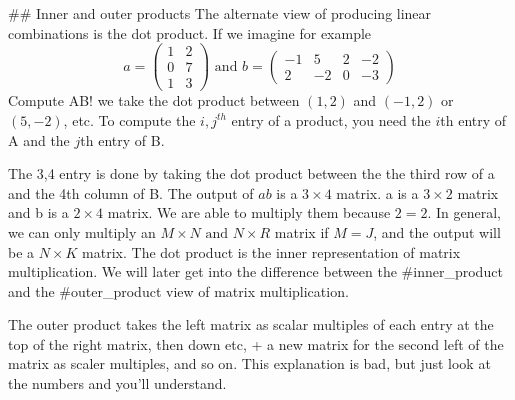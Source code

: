 
## Inner and outer products
The alternate view of producing linear combinations is the dot product. 
If we imagine for example
$$ a = \begin{pmatrix} 1 & 2  \\ 0 & 7  \\ 1 & 3 \end{pmatrix} \text{ and }  b = \begin{pmatrix} -1 & 5 & 2 & -2 \\ 2 & -2 & 0 & -3 \end{pmatrix} $$ 
Compute AB!
we take the dot product between $(1,2)$ and $(-1,2)$ or $(5,-2)$, etc.
To compute the $i,j^{th}$  entry of a product, you need the $i$th entry of A and the $j$th entry of B. 

The 3,4 entry is done by taking the dot product between the the third row of a and the 4th column of B.  The output of $ab$ is a $3\times 4$ matrix. a is a $3\times 2$ matrix and b is a $2 \times 4$ matrix. We are able to multiply them because $2=2$. In general, we can only multiply an $M\times N \text{ and }  N \times R$  matrix if $M=J$, and the output will be a $N\times K$ matrix. The dot product is the inner representation of matrix multiplication. We will later get into the difference between the #inner_product and the #outer_product view of matrix multiplication. 

The outer product takes the left matrix as scalar multiples of each entry at the top of the right matrix, then down etc, + a new matrix for the second left of the matrix as scaler multiples, and so on. This explanation is bad, but just look at the numbers and you'll understand. 

